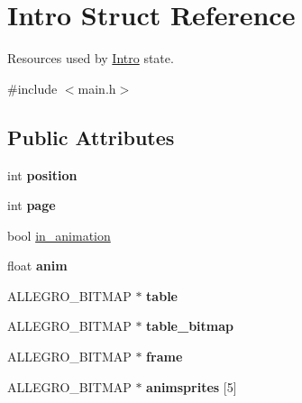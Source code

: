 \hypertarget{structIntro}{\section{\-Intro \-Struct \-Reference}
\label{structIntro}
}


\-Resources used by \hyperlink{structIntro}{\-Intro} state.  




{\ttfamily \#include $<$main.\-h$>$}

\subsection*{\-Public \-Attributes}
\begin{DoxyCompactItemize}
\item 
\hypertarget{structIntro_a5c266b2590d4304f92fd3bad033f4375}{int {\bfseries position}}\label{structIntro_a5c266b2590d4304f92fd3bad033f4375}

\item 
\hypertarget{structIntro_aaea1b2d24c0c9a5437c59d727c79ebd1}{int {\bfseries page}}\label{structIntro_aaea1b2d24c0c9a5437c59d727c79ebd1}

\item 
bool \hyperlink{structIntro_a2876fd8a7bfd940c3936eb6445984a22}{in\-\_\-animation}
\item 
\hypertarget{structIntro_a7bac02ef374847f0efbe638892cb401f}{float {\bfseries anim}}\label{structIntro_a7bac02ef374847f0efbe638892cb401f}

\item 
\hypertarget{structIntro_a342227f3940dba9ed6b5d3bb4579fd48}{\-A\-L\-L\-E\-G\-R\-O\-\_\-\-B\-I\-T\-M\-A\-P $\ast$ {\bfseries table}}\label{structIntro_a342227f3940dba9ed6b5d3bb4579fd48}

\item 
\hypertarget{structIntro_a77ea358d1f44d69e5477f5dedfc9fd2b}{\-A\-L\-L\-E\-G\-R\-O\-\_\-\-B\-I\-T\-M\-A\-P $\ast$ {\bfseries table\-\_\-bitmap}}\label{structIntro_a77ea358d1f44d69e5477f5dedfc9fd2b}

\item 
\hypertarget{structIntro_a122ded263b7d3b22ee9a11555d84df52}{\-A\-L\-L\-E\-G\-R\-O\-\_\-\-B\-I\-T\-M\-A\-P $\ast$ {\bfseries frame}}\label{structIntro_a122ded263b7d3b22ee9a11555d84df52}

\item 
\hypertarget{structIntro_ae89a2ad7dfed9e06a558a5f92bba55bc}{\-A\-L\-L\-E\-G\-R\-O\-\_\-\-B\-I\-T\-M\-A\-P $\ast$ {\bfseries animsprites} \mbox{[}5\mbox{]}}\label{structIntro_ae89a2ad7dfed9e06a558a5f92bba55bc}


\end{DoxyCompactItemize}
